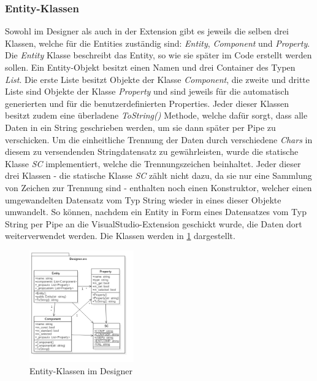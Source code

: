 \subsubsection{Entity-Klassen}
\label{entityklassen}
Sowohl im Designer als auch in der Extension gibt es jeweils die selben drei Klassen, welche für die Entities zuständig sind: \textit{Entity}, \textit{Component} und \textit{Property}.
Die \textit{Entity} Klasse beschreibt das Entity, so wie sie später im Code erstellt werden sollen. Ein Entity-Objekt besitzt einen Namen und drei Container des Typen \textit{List}. Die erste Liste besitzt Objekte der Klasse \textit{Component}, die zweite und dritte Liste sind Objekte der Klasse \textit{Property} und sind jeweils für die automatisch generierten und für die benutzerdefinierten Properties.
Jeder dieser Klassen besitzt zudem eine überladene \textit{ToString()} Methode, welche dafür sorgt, dass alle Daten in ein String geschrieben werden, um sie dann später per Pipe zu verschicken.
Um die einheitliche Trennung der Daten durch verschiedene \textit{Chars} in diesem zu versendenden Stringdatensatz zu gewährleisten, wurde die statische Klasse \textit{SC} implementiert, welche die Trennungszeichen beinhaltet.
Jeder dieser drei Klassen - die statische Klasse \textit{SC} zählt nicht dazu, da sie nur eine Sammlung von Zeichen zur Trennung sind - enthalten noch einen Konstruktor, welcher einen umgewandelten Datensatz vom Typ String wieder in eines dieser Objekte umwandelt. 
So können, nachdem ein Entity in Form eines Datensatzes vom Typ String per Pipe an die VisualStudio-Extension geschickt wurde, die Daten dort weiterverwendet werden. 
Die Klassen werden in \cref{entityklassendiag} dargestellt.
\begin{figure}
	\begin{center}
		\includegraphics[width=0.4\textwidth]{03unserprogramm/Designer/EntityKlassen.png}
		\caption{Entity-Klassen im Designer}\label{entityklassendiag}
	\end{center}
\end{figure}

